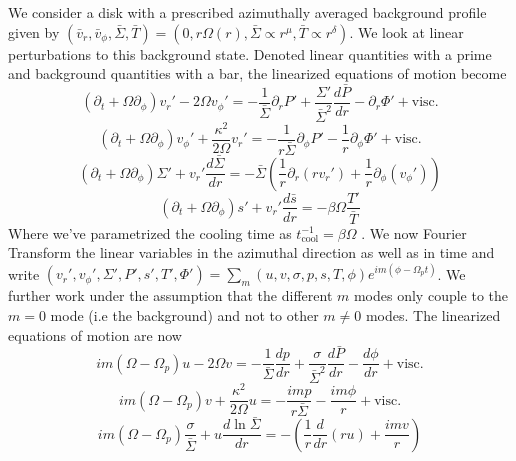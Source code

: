 \documentclass[apj]{emulateapj}
\begin{document}
We consider a disk with a prescribed azimuthally averaged background profile given by $(\bar{v}_r, \bar{v}_\phi, \bar{\Sigma}, \bar{T}) = ( 0, r \Omega(r), \bar{\Sigma} \propto r^\mu, \bar{T} \propto r^\delta) $. We look at linear perturbations to this background state. Denoted linear quantities with a prime and background quantities with a bar, the linearized equations of motion become
\begin{equation}
(\partial_t + \Omega \partial_\phi) v_r' - 2\Omega v_\phi' = - \frac{1}{\bar{\Sigma}} \partial_r P' + \frac{\Sigma'}{\bar{\Sigma}^2} \frac{d \bar{P}}{d r} - \partial_r \Phi' + \text{visc.}
\end{equation}
\begin{equation}
(\partial_t + \Omega \partial_\phi) v_\phi' + \frac{\kappa^2}{2\Omega} v_r' = - \frac{1}{r \bar{\Sigma}} \partial_\phi P'  -\frac{1}{r} \partial_\phi \Phi' + \text{visc.}
\end{equation}
\begin{equation}
(\partial_t + \Omega \partial_\phi)  \Sigma'  + v_r' \frac{ d \bar{\Sigma}}{d r }= - \bar{\Sigma} \left( \frac{1}{r} \partial_r ( r v_r') + \frac{1}{r} \partial_\phi(v_\phi' ) \right)
\end{equation}
\begin{equation}
(\partial_t + \Omega \partial_\phi)  s' +  v_r' \frac{d \bar{s}}{d r}  = - \beta \Omega \frac{T'}{\bar{T}}
\end{equation}
Where we've parametrized the cooling time as $t_\text{cool}^{-1} = \beta \Omega $ \citep{gam01}. We now Fourier Transform the linear variables in the azimuthal direction as well as in time and write $(v_r',v_\phi',\Sigma', P', s', T' , \Phi') = \sum_m  (u,v,\sigma,p,s,T,\phi) e^{ i  m(\phi -  \Omega_p t) } $. We further work under the assumption that the different $m$ modes only couple to the $m=0$ mode (i.e the background) and not to other $m \neq 0$ modes. The linearized equations of motion are now
\begin{equation}
i m (\Omega - \Omega_p) u - 2 \Omega v  = - \frac{1}{\bar{\Sigma}} \frac{d p}{d r} + \frac{\sigma}{\bar{\Sigma}^2} \frac{d \bar{P}}{d r} - \frac{ d \phi}{d r} + \text{visc.}
\end{equation}
 \begin{equation}
i m (\Omega - \Omega_p) v + \frac{\kappa^2}{2 \Omega} u  = - \frac{i m p}{r \bar{\Sigma}}  - \frac{ i m \phi}{ r} + \text{visc.}
\end{equation}
\begin{equation}
i m (\Omega - \Omega_p) \frac{ \sigma }{ \bar{\Sigma}}+ u \frac{d \ln \bar{\Sigma}}{d r} = - \left( \frac{1}{r} \frac{d }{d r} ( r u) + \frac{ i m v}{r } \right)
\end{equation}
\end{document}
